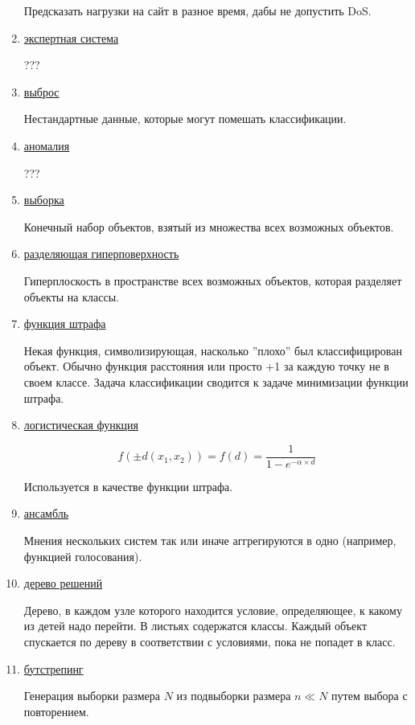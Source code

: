 \documentclass{proc}
\begin{document}
\begin{enumerate}
Предсказать нагрузки на сайт в разное время, дабы не допустить DoS.


\item \underline{экспертная система}

???

\item \underline{выброс}

Нестандартные данные, которые могут помешать классификации.

\item \underline{аномалия}

???

\item \underline{выборка}

Конечный набор объектов, взятый из множества всех возможных объектов.

\item \underline{разделяющая гиперповерхность}

Гиперплоскость в пространстве всех возможных объектов, которая разделяет объекты на классы.

\item \underline{функция штрафа}

Некая функция, символизирующая, насколько ''плохо'' был классифицирован объект. Обычно функция расстояния или просто +1 за каждую точку не в своем классе. Задача классификации сводится к задаче минимизации функции штрафа.

\item \underline{логистическая функция}

$$f(\pm d(x_1,x_2))=f(d)=\frac{1}{1-e^{-\alpha \times d}}$$

Используется в качестве функции штрафа.

\item \underline{ансамбль}

Мнения нескольких систем так или иначе аггрегируются в одно (например, функцией голосования).

\item \underline{дерево решений}

Дерево, в каждом узле которого находится условие, определяющее, к какому из детей надо перейти. В листьях содержатся классы. Каждый объект спускается по дереву в соответствии с условиями, пока не попадет в класс.

\item \underline{бутстрепинг}

Генерация выборки размера $N$ из подвыборки размера $n \ll N$ путем выбора с повторением.


\end{enumerate}
\end{document}
